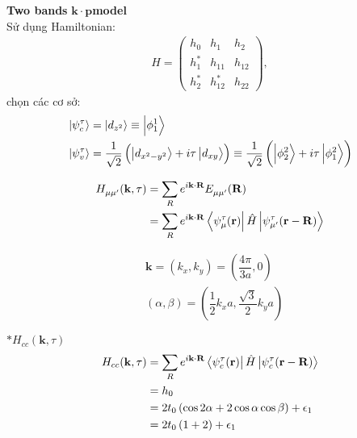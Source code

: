 \documentclass{report}
\newcommand{\f}[2]{\dfrac{#1}{#2}}
\begin{document}
\clearpage
\textbf{Two bands} $\mathbf{k\cdot p}$\;\textbf{model}\\
Sử dụng Hamiltonian:
\begin{align*}
	H =
	\begin{pmatrix}
		h_0   & h_1      & h_2    \\
		h_1^* & h_{11}   & h_{12} \\
		h_2^* & h_{12}^* & h_{22}
	\end{pmatrix},
\end{align*}
chọn các cơ sở:
\begin{align*}
	&\ket{\psi_{c}^{\tau}} = \ket{d_{z^2}} \equiv \ket{\phi^1_1} \\
	&\ket{\mathcal{\psi}_{v}^{\tau}} = \f{1}{\sqrt{2}} \left(\ket{d_{x^2-y^2}} + i\tau \ket{d_{xy}}\right)  \equiv \f{1}{\sqrt{2}} \left(\ket{\phi^2_2} + i\tau \ket{\phi^2_1}\right)
\end{align*}

\begin{align*}
	H_{\mu\mu'}^{}(\mathbf{k},\tau) 
	& = \sum_{R} e^{i\mathbf{k\cdot R}} E_{\mu\mu'}^{}(\mathbf{R}) \\
	& = \sum_{R} e^{i\mathbf{k\cdot R}}\bra{\psi_{\mu}^{\mathfrak{\tau}}(\mathbf{r})}\hat{H}\ket{\mathcal{\psi}_{\mu'}^{\tau}(\mathbf{r - R})}
\end{align*}

\begin{align*}
	&\mathbf{k}  = (k_x,k_y) = \left(\f{4\pi}{3a},0\right) \\
	&(\alpha,\beta) = \left(\dfrac{1}{2} k_x a,\dfrac{\sqrt{3}}{2} k_y a \right)
\end{align*}

$\ast H_{cc}(\mathbf{k},\tau)$
\begin{align*}
	 H_{cc}(\mathbf{k},\tau) 
	 & = \sum_{R} e^{i\mathbf{k\cdot R}}\bra{\psi_{c}^{\mathfrak{\tau}}(\mathbf{r})}\hat{H}\ket{\mathcal{\psi}_{c}^{\tau}(\mathbf{r - R})}\\
	 & = h_0 \\
	 & = 2 t_0 \left(\cos2\alpha + 2\cos\alpha \cos\beta\right) + \epsilon_1 \\
	 & = 2 t_0 \left(1 + 2\right) + \epsilon_1 \\
\end{align*}
\end{document}
